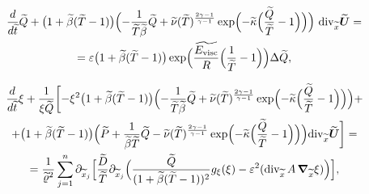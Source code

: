 \begin{multline}

\frac{d}{d\widetilde{t}} \widetilde{Q}+ 

\bigl(1+\widetilde{\beta}(\widetilde{T}-1)\bigr)

\Bigl(-\frac{1}{\widetilde{T} \widetilde{\beta}} \widetilde{Q}+\widetilde{\nu}

(\widetilde{T})^{\frac{2\gamma-1}{\gamma-1}} 

 \exp\Bigl(-\widetilde{\kappa}\Bigl(\frac{\widetilde{Q}}{\widetilde{T}}-1\Bigr) \Bigr)

 \Bigr)~{\mathop{\rm div}\nolimits}_{\widetilde{x}} \widetilde{\boldsymbol U}=\\

 ={\varepsilon} \bigl(1+\widetilde{\beta}(\widetilde{T}-1)\bigr) 

 \exp\Bigl(\frac{\widetilde{E_{\rm visc}}}{R}\Bigl(\frac1{\widetilde{T}}-1\Bigr)\Bigr) \Delta \widetilde{Q},

\end{multline} 

\begin{multline} 

\frac{d}{d\widetilde{t}} \xi+\frac1{\xi \widetilde{Q}}

\biggl[

-\xi^2 \bigl(1+\widetilde{\beta}(\widetilde{T}-1)\bigr)

\Bigl(-\frac{1}{\widetilde{T} \widetilde{\beta}} \widetilde{Q}+\widetilde{\nu}

(\widetilde{T})^{\frac{2\gamma-1}{\gamma-1}}

 \exp\Bigl(-\widetilde{\kappa}\Bigl(\frac{\widetilde{Q}}{\widetilde{T}}-1\Bigr) \Bigr)

 \Bigr)+ 

\\

+\bigl(1+\widetilde{\beta}(\widetilde{T}-1)\bigr)

\Bigl(\widetilde{P}+\frac{1}{\widetilde{\beta}\widetilde{T}} \widetilde{Q}-\widetilde{\nu} (\widetilde{T})^{\frac{2\gamma-1}{\gamma-1}} 

\exp\Bigl(-\widetilde{\kappa}\Bigl(\frac{\widetilde{Q}}{\widetilde{T}}-1\Bigr) \Bigr)\Bigr) {\mathop{\rm div}\nolimits}_{\widetilde{x}}  \widetilde{\boldsymbol U} \biggr]=

\\

=\frac1{\widetilde{\varrho}^2}

\sum_{j=1}^n {\partial}_{\widetilde{x}_j} 

\Bigl[

\frac{\widetilde{D}}{\widetilde{T}} {\partial}_{\widetilde{x}_j}

\Bigl(\frac{\widetilde{Q}}{(1+\widetilde{\beta}(\widetilde{T}-1))^{2}}

g_\xi(\xi)- {\varepsilon}^2 (\mbox{div}_{\widetilde{x}}\, A \,  \boldsymbol {\nabla}_{\widetilde{x}}\xi )\Bigr)\Bigr],

\end{multline}

